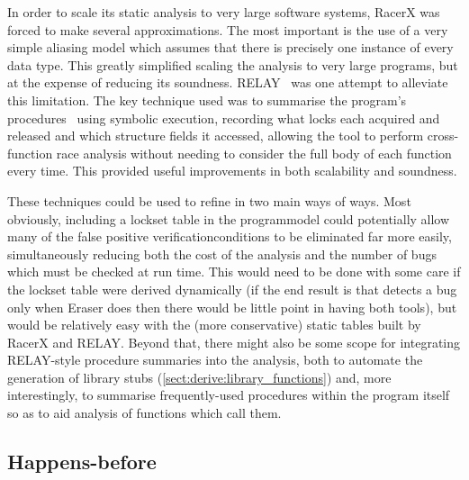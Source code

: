 In order to scale its static analysis to very large software systems,
RacerX was forced to make several approximations.  The most important
is the use of a very simple aliasing model which assumes that there is
precisely one instance of every data type.  This greatly simplified
scaling the analysis to very large programs, but at the expense of
reducing its soundness.  RELAY~\cite{Voung2007} was one attempt to
alleviate this limitation.  The key technique used was to summarise
the program's procedures~\cite{Qadeer2004} using symbolic execution,
recording what locks each acquired and released and which structure
fields it accessed, allowing the tool to perform cross-function race
analysis without needing to consider the full body of each function
every time.  This provided useful improvements in both scalability and
soundness.

These techniques could be used to refine {\technique} in two main ways
of ways.  Most obviously, including a lockset table in the
\gls{programmodel} could potentially allow many of the false positive
\glspl{verificationcondition} to be eliminated far more easily,
simultaneously reducing both the cost of the analysis and the number
of bugs which must be checked at run time.  This would need to be done
with some care if the lockset table were derived dynamically (if the
end result is that {\technique} detects a bug only when Eraser does
then there would be little point in having both tools), but would be
relatively easy with the (more conservative) static tables built by
RacerX and RELAY.  Beyond that, there might also be some scope for
integrating RELAY-style procedure summaries into the {\technique}
analysis, both to automate the generation of library stubs
(\autoref{sect:derive:library_functions}) and, more interestingly, to
summarise frequently-used procedures within the program itself so as
to aid analysis of functions which call them.

\subsection{Happens-before}

